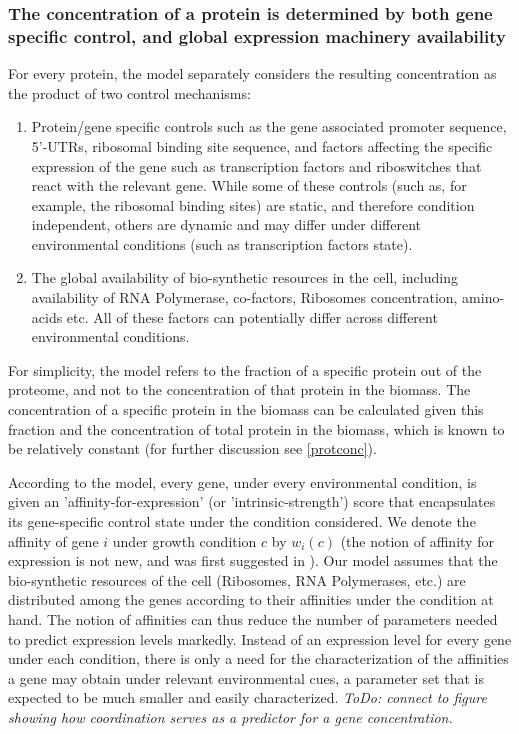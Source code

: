 \documentclass[notitlepage]{article}
\begin{document}
\subsubsection{The concentration of a protein is determined by both gene specific control, and global expression machinery availability}
For every protein, the model separately considers the resulting concentration as the product of two control mechanisms:
\begin{enumerate}
\item Protein/gene specific controls such as the gene associated promoter sequence, 5'-UTRs, ribosomal binding site sequence, and factors affecting the specific expression of the gene such as transcription factors and riboswitches that react with the relevant gene.
  While some of these controls (such as, for example, the ribosomal binding sites) are static, and therefore condition independent, others are dynamic and may differ under different environmental conditions (such as transcription factors state).
\item The global availability of bio-synthetic resources in the cell, including availability of RNA Polymerase, co-factors, Ribosomes concentration, amino-acids etc.
  All of these factors can potentially differ across different environmental conditions.
\end{enumerate}
For simplicity, the model refers to the fraction of a specific protein out of the proteome, and not to the concentration of that protein in the biomass.
The concentration of a specific protein in the biomass can be calculated given this fraction and the concentration of total protein in the biomass, which is known to be relatively constant \cite{eco-sal} (for further discussion see \ref{protconc}).

According to the model, every gene, under every environmental condition, is given an 'affinity-for-expression' (or 'intrinsic-strength') score that encapsulates its gene-specific control state under the condition considered.
We denote the affinity of gene $i$ under growth condition $c$ by $w_i(c)$ (the notion of affinity for expression is not new, and was first suggested in  \cite{Maaloe1969}).
Our model assumes that the bio-synthetic resources of the cell (Ribosomes, RNA Polymerases, etc.) are distributed among the genes according to their affinities under the condition at hand.
The notion of affinities can thus reduce the number of parameters needed to predict expression levels markedly.
Instead of an expression level for every gene under each condition, there is only a need for the characterization of the affinities a gene may obtain under relevant environmental cues, a parameter set that is expected to be much smaller and easily characterized.
\emph{ToDo: connect to figure showing how coordination serves as a predictor for a gene concentration.}
\end{document}
